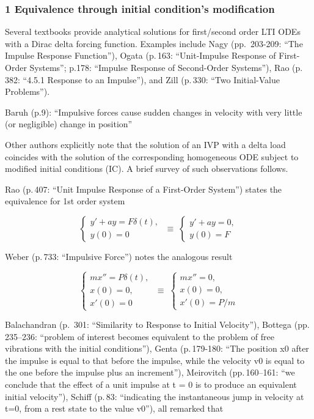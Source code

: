 \documentclass[
  11pt,
]{article}
\begin{document}
\hypertarget{equivalence-through-initial-conditions-modification}{%
\subsubsection{1 Equivalence through initial condition's
modification}\label{equivalence-through-initial-conditions-modification}}

Several textbooks provide analytical solutions for first/second order
LTI ODEs with a Dirac delta forcing function. Examples include Nagy
(pp.~203-209: ``The Impulse Response Function''), Ogata (p.\,163:
``Unit-Impulse Response of First-Order Systems''; p.178: ``Impulse
Response of Second-Order Systems''), Rao (p.\,382: ``4.5.1 Response to
an Impulse''), and Zill (p.\,330: ``Two Initial-Value Problems'').

Baruh (p.9): ``Impulsive forces cause sudden changes in velocity with
very little (or negligible) change in position''

Other authors explicitly note that the solution of an IVP with a delta
load coincides with the solution of the corresponding homogeneous ODE
subject to modified initial conditions (IC). A brief survey of such
observations follows.

Rao (p.\,407: ``Unit Impulse Response of a First-Order System'') states
the equivalence for 1st order system

\[
\begin{cases}
y' + a y = F \delta(t), \\
y(0) = 0
\end{cases}
\;\equiv\;
\begin{cases}
y' + a y = 0, \\
y(0) = F
\end{cases}
\]

Weber (p.\,733: ``Impulsive Force'') notes the analogous result

\[
\begin{cases}
m x'' = P \delta(t), \\
x(0) = 0, \\
x'(0) = 0
\end{cases}
\;\equiv\;
\begin{cases}
m x'' = 0, \\
x(0) = 0, \\
x'(0) = P/m
\end{cases}
\]

Balachandran (p.~301: ``Similarity to Response to Initial Velocity''),
Bottega (pp.\,235--236: ``problem of interest becomes equivalent to the
problem of free vibrations with the initial conditions''), Genta
(p.\,179-180: ``The position x0 after the impulse is equal to that
before the impulse, while the velocity v0 is equal to the one before the
impulse plus an increment''), Meirovitch (pp.\,160--161: ``we conclude
that the effect of a unit impulse at t = 0 is to produce an equivalent
initial velocity''), Schiff (p.\,83: ``indicating the instantaneous jump
in velocity at t=0, from a rest state to the value v0''), all remarked
that
\end{document}
